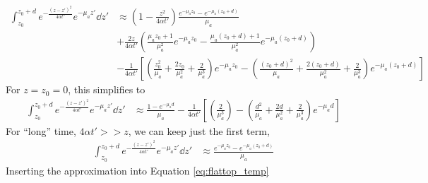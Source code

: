 \documentclass[]{article}
\begin{document}
\begin{align*}
    \int_{z_0}^{z_0 + d} e^{-\frac{(z-z')^2}{4\alpha t'}} e^{-\mu_a z'} \dd z' &\approx
    \left(1 -  \frac{z^2}{4\alpha t'}\right)\frac{e^{-\mu_a z_0} - e^{-\mu_a (z_0+d)}}{\mu_a} \\
    &+ \frac{2z}{4\alpha t'} \left( \frac{\mu_a z_0 + 1}{\mu_a^2}e^{-\mu_a z_0} - \frac{\mu_a (z_0+d) + 1}{\mu_a^2}e^{-\mu_a (z_0+d)}\right) \\
    &- \frac{1}{4\alpha t'}\left[
   \left( \frac{z_0^2}{\mu_a} + \frac{2z_0}{\mu_a^2} + \frac{2}{\mu_a^3} \right)e^{-\mu_a z_0} -
   \left( \frac{(z_0 + d)^2}{\mu_a} + \frac{2(z_0 + d)}{\mu_a^2} + \frac{2}{\mu_a^3} \right)e^{-\mu_a (z_0+d)}
   \right]
\end{align*}
For $z=z_0=0$, this simplifies to
\begin{align*}
    \int_{z_0}^{z_0 + d} e^{-\frac{(z-z')^2}{4\alpha t'}} e^{-\mu_a z'} \dd z' &\approx
    \frac{1 - e^{-\mu_a d}}{\mu_a}
    - \frac{1}{4\alpha t'}\left[
   \left( \frac{2}{\mu_a^3} \right) -
   \left( \frac{d^2}{\mu_a} + \frac{2d}{\mu_a^2} + \frac{2}{\mu_a^3} \right)e^{-\mu_a d}
   \right]
\end{align*}
For ``long'' time, $4\alpha t' >> z$, we can keep just the first term,
\begin{align*}
    \int_{z_0}^{z_0 + d} e^{-\frac{(z-z')^2}{4\alpha t'}} e^{-\mu_a z'} \dd z' &\approx
    \frac{e^{-\mu_a z_0} - e^{-\mu_a (z_0+d)}}{\mu_a}
\end{align*}
Inserting the approximation into Equation \ref{eq:flattop_temp}
\end{document}
